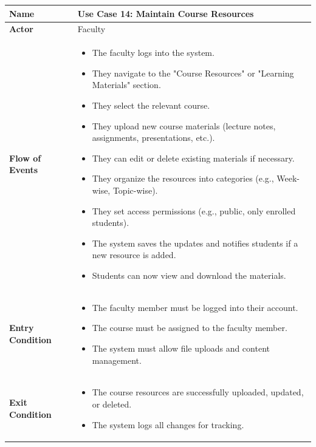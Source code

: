 \documentclass[11pt]{article}
\begin{document}
\begin{center}
\begin{tabular}{ | >{\bfseries}m{6em} | m{10cm} | }
  \hline
  \textbf{Name} & Use Case 14: Maintain Course Resources \\
  \hline
  \textbf{Actor} & Faculty \\
  \hline
  \textbf{Flow of Events} & 
  \begin{itemize}
      \item The faculty logs into the system.
      \item They navigate to the "Course Resources" or "Learning Materials" section.
      \item They select the relevant course.
      \item They upload new course materials (lecture notes, assignments, presentations, etc.).
      \item They can edit or delete existing materials if necessary.
      \item They organize the resources into categories (e.g., Week-wise, Topic-wise).
      \item They set access permissions (e.g., public, only enrolled students).
      \item The system saves the updates and notifies students if a new resource is added.
      \item Students can now view and download the materials.
  \end{itemize} \\
  \hline
  \textbf{Entry Condition} & 
  \begin{itemize}
      \item The faculty member must be logged into their account.
      \item The course must be assigned to the faculty member.
      \item The system must allow file uploads and content management.
  \end{itemize} \\
  \hline
  \textbf{Exit Condition} & 
    \begin{itemize}
    \item The course resources are successfully uploaded, updated, or deleted. 
    \item The system logs all changes for tracking.
      \end{itemize} \\
  \hline
\end{tabular}
\end{center}
\end{document}
